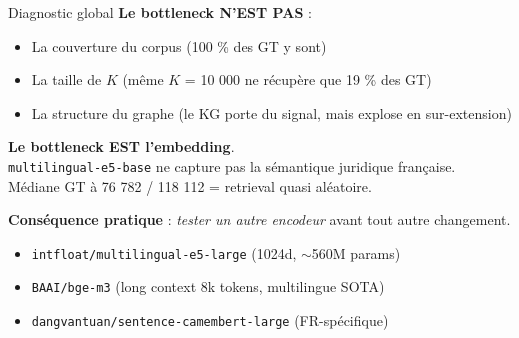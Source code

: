 \documentclass[aspectratio=169,10pt]{beamer}
\newcommand{\warnbox}[1]{%
  \begin{center}
  \colorbox{red!10}{\parbox{0.92\linewidth}{\centering #1}}
  \end{center}}
\begin{document}
\begin{frame}{Diagnostic global}
  \footnotesize
  \textbf{Le bottleneck N'EST PAS} :
  \begin{itemize}
    \item \textcolor{ok}{\checkmark} La couverture du corpus (100 \% des GT y sont)
    \item \textcolor{ok}{\checkmark} La taille de $K$ (même $K$ = 10 000 ne récupère que 19 \% des GT)
    \item \textcolor{ok}{\checkmark} La structure du graphe (le KG porte du signal, mais explose en sur-extension)
  \end{itemize}

  \vspace{0.6em}
  \warnbox{\textbf{Le bottleneck EST l'embedding}.\\
  \texttt{multilingual-e5-base} ne capture pas la sémantique juridique française.\\
  Médiane GT à 76 782 / 118 112 = retrieval quasi aléatoire.}

  \vspace{0.6em}
  \textbf{Conséquence pratique} : \textit{tester un autre encodeur} avant tout autre changement.

  \begin{itemize}\footnotesize
    \item \texttt{intfloat/multilingual-e5-large} (1024d, $\sim$560M params)
    \item \texttt{BAAI/bge-m3} (long context 8k tokens, multilingue SOTA)
    \item \texttt{dangvantuan/sentence-camembert-large} (FR-spécifique)
  \end{itemize}
\end{frame}
\end{document}
